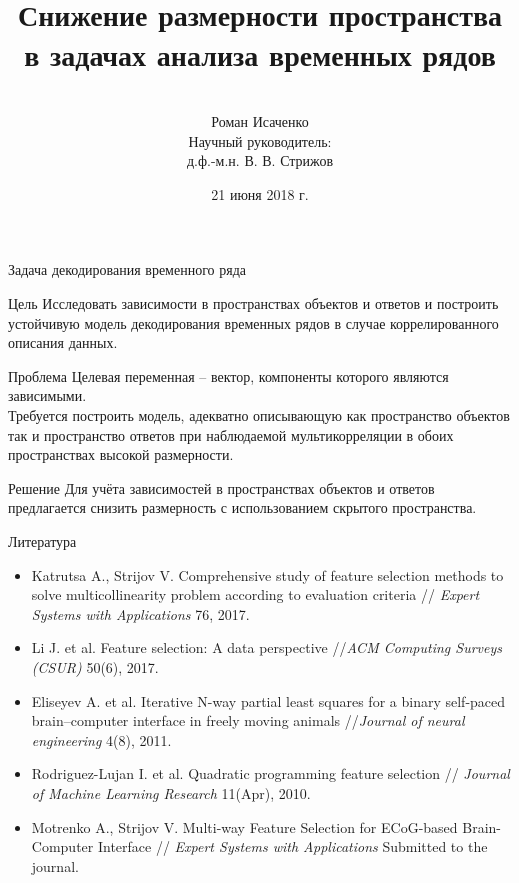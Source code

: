 \documentclass[9pt]{beamer}
\title[\hbox to 56mm{  \hfill\insertframenumber\,/\,\inserttotalframenumber}]
{\\ \vspace{1.5cm} Снижение размерности пространства \\ в задачах анализа временных рядов}
\author[Роман Исаченко]{\\ 
	\vspace{.4cm}
	Роман Исаченко \\
	\vspace{3mm}
	{\footnotesize Научный руководитель: \\
	д.ф.-м.н. В. В. Стрижов}}
\institute[МФТИ(ГУ)]{
Московский физико-технический институт\\
Факультет управления и прикладной математики\\
Кафедра <<Интеллектуальные системы>>}
\date{21 июня 2018 г.}
\begin{document}
\begin{frame}
\titlepage
\end{frame}
\begin{frame}{Задача декодирования временного ряда}
	\begin{block}{Цель}
		Исследовать зависимости в пространствах объектов и ответов и построить устойчивую модель декодирования временных рядов в случае коррелированного описания данных.
	\end{block}
	\begin{block}{Проблема}
		Целевая переменная -- вектор, компоненты которого являются зависимыми. \\
		Требуется построить модель, адекватно описывающую как пространство объектов так и пространство ответов при наблюдаемой мультикорреляции в обоих пространствах высокой размерности. 
	\end{block}
	\begin{block}{Решение}
		Для учёта зависимостей в пространствах объектов и ответов предлагается снизить размерность с использованием скрытого пространства. 
	\end{block}
\end{frame}
\begin{frame}{Литература}
	\begin{itemize}
		\item Katrutsa A., Strijov V. Comprehensive study of feature selection methods to solve multicollinearity problem according to evaluation criteria // \textit{Expert Systems with Applications} 76, 2017.
		\vfill
		\item Li J. et al. Feature selection: A data perspective //\textit{ACM Computing Surveys (CSUR)} 50(6), 2017.
		\vfill
		\item Eliseyev A. et al. Iterative N-way partial least squares for a binary self-paced brain–computer interface in freely moving animals //\textit{Journal of neural engineering} 4(8), 2011.
		\vfill
		\item Rodriguez-Lujan I. et al. Quadratic programming feature selection // \textit{Journal of Machine Learning Research} 11(Apr), 2010.
		\vfill
		\item Motrenko A., Strijov V. Multi-way Feature Selection for ECoG-based Brain-Computer Interface // \textit{Expert Systems with Applications} Submitted to the journal.
	\end{itemize}
\end{frame}
\end{document}
